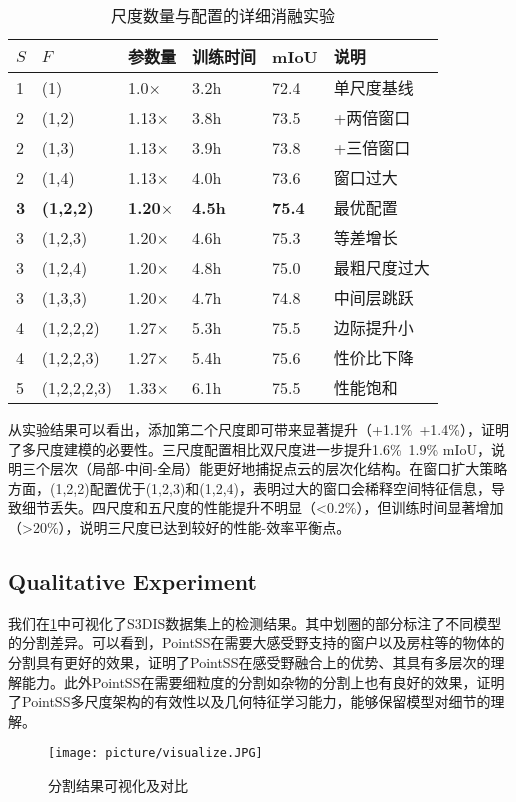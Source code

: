 \documentclass[preprint,12pt]{elsarticle}
\begin{document}
\begin{table}[htbp!]
	\centering
	\caption{尺度数量与配置的详细消融实验}
	\label{tab:scale_number}
	\begin{tabular}{@{}llllll@{}}
		\toprule
		$S$ & $F$ & 参数量 & 训练时间 & mIoU & 说明 \\ 
		\midrule
		1 & (1) & 1.0$\times$ & 3.2h & 72.4 & 单尺度基线 \\
		\midrule
		2 & (1,2) & 1.13$\times$ & 3.8h & 73.5 & +两倍窗口 \\
		2 & (1,3) & 1.13$\times$ & 3.9h & 73.8 & +三倍窗口 \\
		2 & (1,4) & 1.13$\times$ & 4.0h & 73.6 & 窗口过大 \\
		\midrule
		\textbf{3} & \textbf{(1,2,2)} & \textbf{1.20$\times$} & \textbf{4.5h} & \textbf{75.4} & 最优配置 \\
		3 & (1,2,3) & 1.20$\times$ & 4.6h & 75.3 & 等差增长 \\
		3 & (1,2,4) & 1.20$\times$ & 4.8h & 75.0 & 最粗尺度过大 \\
		3 & (1,3,3) & 1.20$\times$ & 4.7h & 74.8 & 中间层跳跃 \\
		\midrule
		4 & (1,2,2,2) & 1.27$\times$ & 5.3h & 75.5 & 边际提升小 \\
		4 & (1,2,2,3) & 1.27$\times$ & 5.4h & 75.6 & 性价比下降 \\
		5 & (1,2,2,2,3) & 1.33$\times$ & 6.1h & 75.5 & 性能饱和 \\
		\bottomrule
	\end{tabular}
\end{table}

从实验结果可以看出，添加第二个尺度即可带来显著提升（+1.1\%~+1.4\%），证明了多尺度建模的必要性。三尺度配置相比双尺度进一步提升1.6\%~1.9\% mIoU，说明三个层次（局部-中间-全局）能更好地捕捉点云的层次化结构。在窗口扩大策略方面，(1,2,2)配置优于(1,2,3)和(1,2,4)，表明过大的窗口会稀释空间特征信息，导致细节丢失。四尺度和五尺度的性能提升不明显（<0.2\%），但训练时间显著增加（>20\%），说明三尺度已达到较好的性能-效率平衡点。



\subsection{Qualitative Experiment}
我们在\cref{fig:vis}中可视化了S3DIS数据集上的检测结果。其中划圈的部分标注了不同模型的分割差异。可以看到，PointSS在需要大感受野支持的窗户以及房柱等的物体的分割具有更好的效果，证明了PointSS在感受野融合上的优势、其具有多层次的理解能力。此外PointSS在需要细粒度的分割如杂物的分割上也有良好的效果，证明了PointSS多尺度架构的有效性以及几何特征学习能力，能够保留模型对细节的理解。
\begin{figure}[htbp]
	\centering
	\texttt{[image: picture/visualize.JPG]}
	\caption{分割结果可视化及对比}
	\label{fig:vis}
\end{figure}
\end{document}
